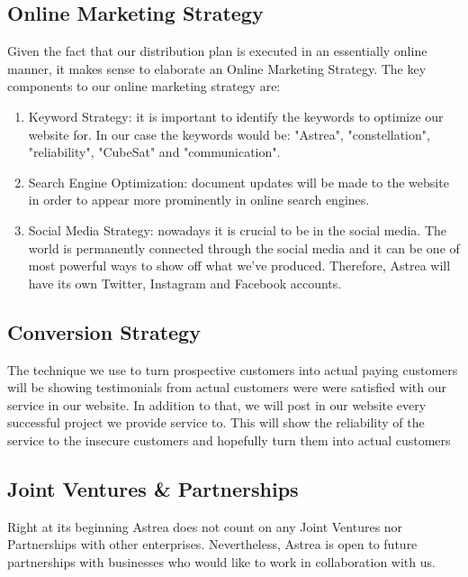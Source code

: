 \subsection{Online Marketing Strategy}
Given the fact that our distribution plan is executed in an essentially online manner, it makes sense to elaborate an Online Marketing Strategy. The key components to our online marketing strategy are:
\begin{enumerate}
\item Keyword Strategy: it is important to identify the keywords to optimize our website for. In our case the keywords would be: "Astrea", "constellation", "reliability", "CubeSat" and "communication".
\item Search Engine Optimization: document updates will be made to the website in order to appear more prominently in online search engines.
\item Social Media Strategy: nowadays it is crucial to be in the social media. The world is permanently connected through the social media and it can be one of most powerful ways to show off what we've produced. Therefore, Astrea will have its own Twitter, Instagram and Facebook accounts.
\end{enumerate}
\subsection{Conversion Strategy}
The technique we use to turn prospective customers into actual paying customers will be showing testimonials from actual customers were were satisfied with our service in our website. In addition to that, we will post in our website every successful project we provide service to. This will show the reliability of the service to the insecure customers and hopefully turn them into actual customers
\subsection{Joint Ventures \& Partnerships}
Right at its beginning Astrea does not count on any Joint Ventures nor Partnerships with other enterprises. Nevertheless, Astrea is open to future partnerships with businesses who would like to work in collaboration with us.